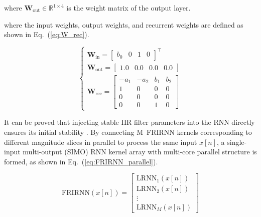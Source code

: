 \documentclass[journal]{IEEEtran}
\newcommand{\mmax}{M} %
\begin{document}
          where $ \mathbf{W}_{\text{out}} \in \mathbb{R}^{1 \times 4} $ is the weight matrix of the output layer.



where the input weights, output weights, and recurrent weights are defined as shown in Eq.~(\ref{eq:W_rec}).

\begin{equation}
    \begin{cases}
        \mathbf{W}_{\text{in}} = \begin{bmatrix}
                                     b_0 & 0 & 1 & 0
                                 \end{bmatrix}^\top     \\
        \mathbf{W}_{\text{out}} = \begin{bmatrix}
                                      1.0 & 0.0 & 0.0 & 0.0
                                  \end{bmatrix} \\
        \mathbf{W}_{\text{rec}} = \begin{bmatrix}
                                      -a_1 & -a_2 & b_1 & b_2 \\
                                      1    & 0    & 0   & 0   \\
                                      0    & 0    & 0   & 0   \\
                                      0    & 0    & 1   & 0
                                  \end{bmatrix}
    \end{cases}
    \label{eq:W_rec}
\end{equation}


It can be proved that injecting stable IIR filter parameters into the RNN directly ensures its initial stability \cite{WOS:001148230800001}. By connecting \mmax~FRIRNN kernels corresponding to different magnitude slices in parallel to process the same input $x[n]$, a single-input multi-output (SIMO) RNN kernel array with multi-core parallel structure is formed, as shown in Eq.~(\ref{eq:FRIRNN_parallel}).

\begin{equation}
    \mathrm{FRIRNN}(x[n]) = \begin{bmatrix}
        \mathrm{LRNN}_1(x[n]) \\
        \mathrm{LRNN}_2(x[n]) \\
        \vdots                \\
        \mathrm{LRNN}_{\mmax}(x[n])
    \end{bmatrix}
    \label{eq:FRIRNN_parallel}
\end{equation}
\end{document}
